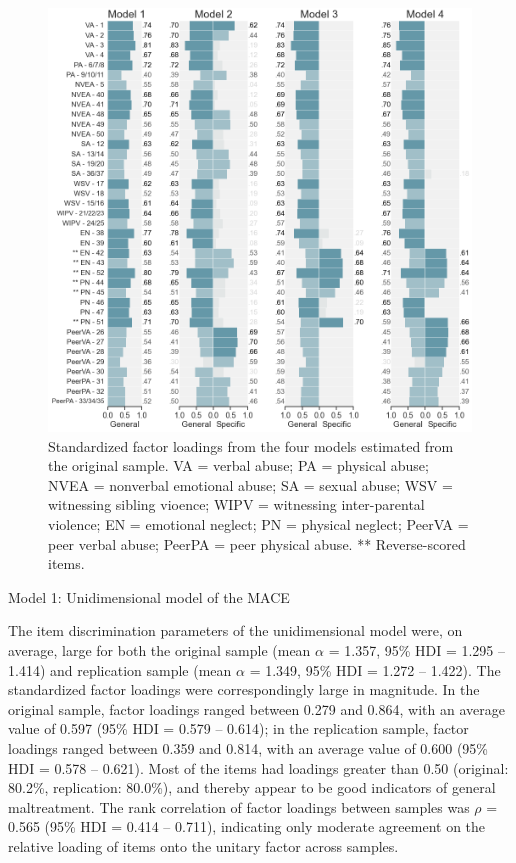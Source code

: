 \documentclass[letterpaper,man,natbib,floatsintext,longtable]{apa6}
\makeatletter
\renewcommand{\subsubsection}{\@startsection{subsubsection}{3}
  {\z@}%
  {\b@level@two@skip}{\e@level@two@skip}%
  {\normalfont\normalsize\bfseries}}
\makeatother
\begin{document}
\begin{figure}[t!]
    \centering
    \includegraphics[width=1.1\textwidth,center]{figures/fig02.png}
    \caption{Standardized factor loadings from the four models estimated from the original sample. VA = verbal abuse; PA = physical abuse; NVEA = nonverbal emotional abuse; SA = sexual abuse; WSV = witnessing sibling vioence; WIPV = witnessing inter-parental violence; EN = emotional neglect; PN = physical neglect; PeerVA = peer verbal abuse; PeerPA = peer physical abuse. ** Reverse-scored items.}
    \label{fig:loadings_original}
\end{figure}

\subsubsection{Model 1: Unidimensional model of the MACE}

The item discrimination parameters of the unidimensional model were, on average, large for both the original sample (mean $\alpha$ = 1.357, 95\% HDI = 1.295 -- 1.414) and replication sample (mean $\alpha$ = 1.349, 95\% HDI = 1.272 -- 1.422). The standardized factor loadings were correspondingly large in magnitude. In the original sample, factor loadings ranged between 0.279 and 0.864, with an average value of 0.597 (95\% HDI = 0.579 -- 0.614); in the replication sample, factor loadings ranged between 0.359 and 0.814, with an average value of 0.600 (95\% HDI = 0.578 -- 0.621). Most of the items had loadings greater than 0.50 (original: 80.2\%, replication: 80.0\%), and thereby appear to be good indicators of general maltreatment. The rank correlation of factor loadings between samples was $\rho$ = 0.565 (95\% HDI = 0.414 -- 0.711), indicating only moderate agreement on the relative loading of items onto the unitary factor across samples. 
\end{document}
